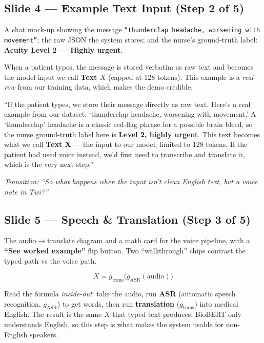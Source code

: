 \documentclass[11pt]{article}
\newcommand{\chip}[2]{\textcolor{#1}{\textbf{#2}}}
\newcommand{\transition}[1]{\medskip\noindent\textit{\textcolor{mutel}{Transition: #1}}\medskip}
\newcommand{\route}[1]{{\small\texttt{\textcolor{mutel}{#1}}}}
\newcommand{\slide}[3]{%
  \subsection{Slide #1 --- #2}%
  \noindent\route{Route: #3}\par\smallskip}
\begin{document}
\slide{4}{Example Text Input (Step 2 of 5)}{/dashboard/pipeline/text-example}

\begin{onscreen}
A chat mock-up showing the message \texttt{``thunderclap headache, worsening with movement''}; the raw
JSON the system stores; and the nurse's ground-truth label: \chip{satOrange}{Acuity Level 2 --- Highly urgent}.
\end{onscreen}

\begin{idea}
When a patient types, the message is stored verbatim as raw text and becomes the model input we call
\textbf{Text $X$} (capped at 128 tokens). This example is a \emph{real row} from our training data, which
makes the demo credible.
\end{idea}

\begin{saybox}
``If the patient types, we store their message directly as raw text. Here's a real example from our
dataset: `thunderclap headache, worsening with movement.' A `thunderclap' headache is a classic red-flag
phrase for a possible brain bleed, so the nurse ground-truth label here is \chip{satOrange}{Level 2,
highly urgent}. This text becomes what we call \textbf{Text X} --- the input to our model, limited to 128
tokens. If the patient had used voice instead, we'd first need to transcribe and translate it, which is
the very next step.''
\end{saybox}

\transition{``So what happens when the input isn't clean English text, but a voice note in Twi?''}

\slide{5}{Speech \& Translation (Step 3 of 5)}{/dashboard/pipeline/voice}

\begin{onscreen}
The audio$\rightarrow$translate diagram and a math card for the voice pipeline, with a
\textbf{``See worked example''} flip button. Two ``walkthrough'' chips contrast the typed path vs the voice path.
\end{onscreen}

\[
X = g_{\mathrm{trans}}\!\bigl(g_{\mathrm{ASR}}(\text{audio})\bigr)
\]

\begin{idea}
Read the formula \emph{inside-out}: take the audio, run \textbf{ASR} (automatic speech recognition,
$g_{\mathrm{ASR}}$) to get words, then run \textbf{translation} ($g_{\mathrm{trans}}$) into medical
English. The result is the same $X$ that typed text produces. BioBERT only understands English, so this
step is what makes the system usable for non-English speakers.
\end{idea}
\end{document}
